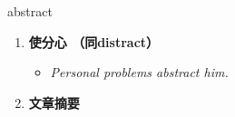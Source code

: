 
\begin{frame}
{\huge abstract}
\begin{center}
\begin{enumerate}\Large
  \item \textbf{使分心 （同distract）}
  \begin{itemize}
    \item \em{\Large{Personal problems abstract him.}}
  \end{itemize}
  \item \textbf{文章摘要}
\end{enumerate}
\end{center}
\end{frame}
